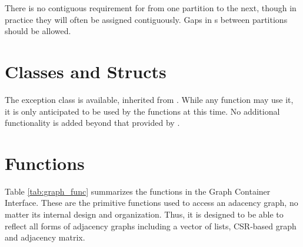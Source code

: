There is no contiguous requirement for  from one partition to the next, though
in practice they will often be assigned contiguously. Gaps in s between partitions should be allowed.

\section{Classes and Structs}

The  exception class is available, inherited from . While any function may use it, it 
is only anticipated to be used by the  functions at this time.
No additional functionality is added beyond that provided by .

\section{Functions}

Table \ref{tab:graph_func} summarizes the functions in the Graph Container Interface. These are the primitive functions used to access an adacency graph, no matter its internal design and organization. Thus, it is designed to be able to reflect all forms of adjacency graphs including a vector of lists, CSR-based graph and adjacency matrix.


